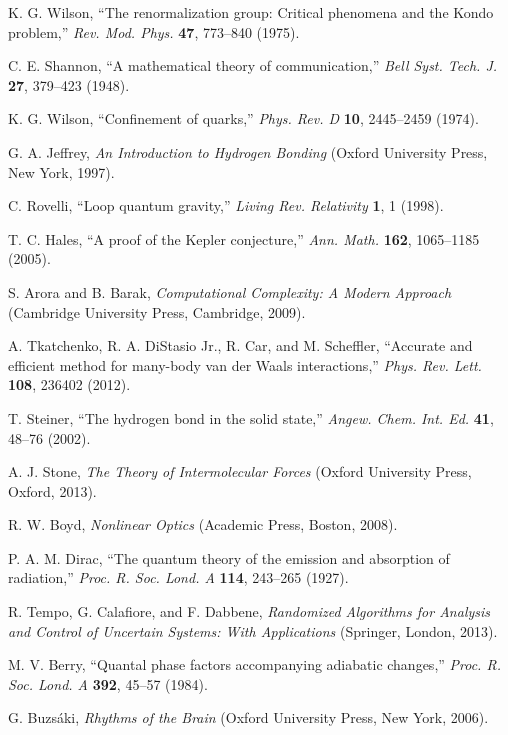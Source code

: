 \documentclass[twocolumn,prd,amsmath,amssymb,aps,superscriptaddress,nofootinbib]{revtex4-2}
\begin{document}
\begin{thebibliography}{50}
 K. G. Wilson, ``The renormalization group: Critical phenomena and the Kondo problem,'' \textit{Rev. Mod. Phys.} \textbf{47}, 773--840 (1975).

 C. E. Shannon, ``A mathematical theory of communication,'' \textit{Bell Syst. Tech. J.} \textbf{27}, 379--423 (1948).

 K. G. Wilson, ``Confinement of quarks,'' \textit{Phys. Rev. D} \textbf{10}, 2445--2459 (1974).

 G. A. Jeffrey, \textit{An Introduction to Hydrogen Bonding} (Oxford University Press, New York, 1997).

 C. Rovelli, ``Loop quantum gravity,'' \textit{Living Rev. Relativity} \textbf{1}, 1 (1998).

 T. C. Hales, ``A proof of the Kepler conjecture,'' \textit{Ann. Math.} \textbf{162}, 1065--1185 (2005).

 S. Arora and B. Barak, \textit{Computational Complexity: A Modern Approach} (Cambridge University Press, Cambridge, 2009).

 A. Tkatchenko, R. A. DiStasio Jr., R. Car, and M. Scheffler, ``Accurate and efficient method for many-body van der Waals interactions,'' \textit{Phys. Rev. Lett.} \textbf{108}, 236402 (2012).

 T. Steiner, ``The hydrogen bond in the solid state,'' \textit{Angew. Chem. Int. Ed.} \textbf{41}, 48--76 (2002).

 A. J. Stone, \textit{The Theory of Intermolecular Forces} (Oxford University Press, Oxford, 2013).

 R. W. Boyd, \textit{Nonlinear Optics} (Academic Press, Boston, 2008).

 P. A. M. Dirac, ``The quantum theory of the emission and absorption of radiation,'' \textit{Proc. R. Soc. Lond. A} \textbf{114}, 243--265 (1927).

 R. Tempo, G. Calafiore, and F. Dabbene, \textit{Randomized Algorithms for Analysis and Control of Uncertain Systems: With Applications} (Springer, London, 2013).

 M. V. Berry, ``Quantal phase factors accompanying adiabatic changes,'' \textit{Proc. R. Soc. Lond. A} \textbf{392}, 45--57 (1984).

 G. Buzsáki, \textit{Rhythms of the Brain} (Oxford University Press, New York, 2006).


\end{thebibliography}
\end{document}
